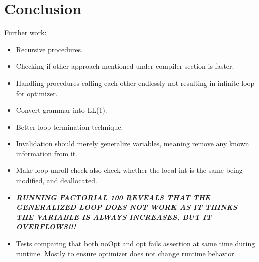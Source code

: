 \section{Conclusion \ms}
Further work:
\begin{itemize}
    \item Recursive procedures.
    \item Checking if other approach mentioned under compiler section is faster.
    \item Handling procedures calling each other endlessly not resulting in infinite loop
          for optimizer.
    \item Convert grammar into LL(1).
    \item Better loop termination technique.
    \item Invalidation should merely generalize variables, meaning remove any known information
          from it.
    \item Make loop unroll check also check whether the local int is the same being modified,
          and deallocated.
    \item \textbf{\emph{RUNNING FACTORIAL 100 REVEALS THAT THE GENERALIZED LOOP DOES NOT WORK
          AS IT THINKS THE VARIABLE IS ALWAYS INCREASES, BUT IT OVERFLOWS!!!}}
    \item Tests comparing that both noOpt and opt fails assertion at same time during runtime.
          Mostly to ensure optimizer does not change runtime behavior.
\end{itemize}